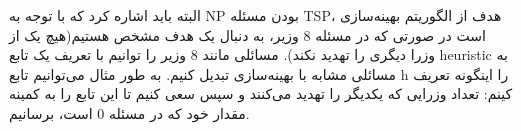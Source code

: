 البته باید اشاره کرد که با توجه به NP بودن مسئله TSP، هدف از الگوریتم بهینه‌سازی است در صورتی که در مسئله 8 وزیر، به دنبال یک هدف مشخص هستیم(هیچ یک از وزرا دیگری را تهدید نکند).
مسائلی مانند 8 وزیر را ‌توانیم با تعریف یک تابع heuristic به مسائلی مشابه با بهینه‌سازی تبدیل کنیم.
به طور مثال می‌توانیم تابع h را اینگونه تعریف کینم: تعداد وزرایی که یکدیگر را تهدید می‌کنند و سپس سعی کنیم تا این تابع را به کمینه مقدار خود که در مسئله 0 است، برسانیم.







